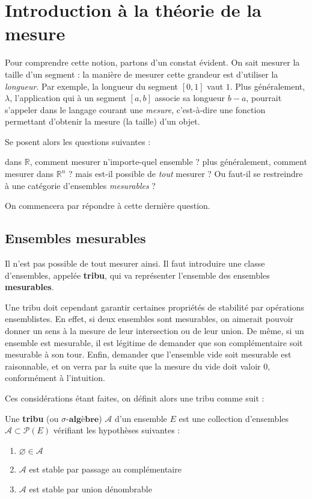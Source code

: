\documentclass[../integ-proba.tex]{subfiles}
\begin{document}
  \chapter{Introduction à la théorie de la mesure}

  Pour comprendre cette notion, partons d'un constat évident. On sait mesurer la taille d'un segment : la manière de mesurer cette grandeur est d'utiliser la \textit{longueur}.
  Par exemple, la longueur du segment $\left[0,1\right]$ vaut $1$.
  Plus généralement, $\lambda$, l'application qui à un segment $\left[a,b\right]$ associe sa longueur $b-a$, pourrait s'appeler dans le langage courant une \textit{mesure}, c'est-à-dire une fonction permettant d'obtenir la mesure (la taille) d'un objet.

  Se posent alors les questions suivantes :
  \begin{itemize}
    \itemb dans $\mathbb{R}$, comment mesurer n'importe-quel ensemble ?
    \itemb plus généralement, comment mesurer dans $\mathbb{R}^n$ ?
    \itemb mais est-il possible de \textit{tout} mesurer ? Ou faut-il se restreindre à une catégorie d'ensembles \textit{mesurables} ?
  \end{itemize}

  On commencera par répondre à cette dernière question.

  \section{Ensembles mesurables}

  Il n'est pas possible de tout mesurer ainsi. Il faut introduire une classe d'ensembles, appelée \textbf{tribu}, qui va représenter l'ensemble des ensembles \textbf{mesurables}.

  Une tribu doit cependant garantir certaines propriétés de stabilité par opérations ensemblistes.
  En effet, si deux ensembles sont mesurables, on aimerait pouvoir donner un sens à la mesure de leur intersection ou de leur union.
  De même, si un ensemble est mesurable, il est légitime de demander que son complémentaire soit mesurable à son tour.
  Enfin, demander que l'ensemble vide soit mesurable est raisonnable, et on verra par la suite que la mesure du vide doit valoir $0$, conformément à l'intuition.

  Ces considérations étant faites, on définit alors une tribu comme suit :

  \begin{defi}
    Une \textbf{tribu} (ou $\sigma\textbf{-algèbre}$) $\mathcal{A}$ d'un ensemble $E$ est une collection d'ensembles $\mathcal{A} \subset \mathcal{P}(E)$ vérifiant les hypothèses suivantes :
    \begin{enumerate}
      \item $\varnothing \in \mathcal{A}$
      \item $\mathcal{A}$ est stable par passage au complémentaire
      \item $\mathcal{A}$ est stable par union dénombrable
    \end{enumerate}
  \end{defi}
\end{document}
